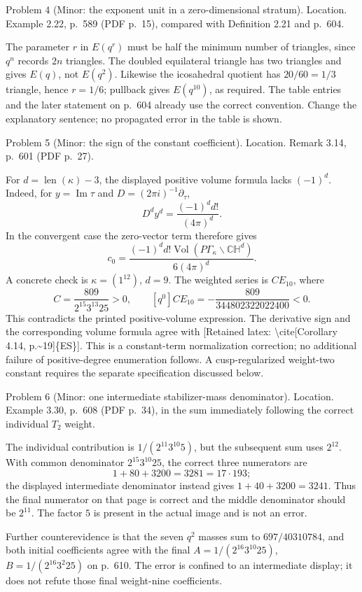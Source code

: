 \documentclass[10pt]{article}
\begin{document}
Problem 4 (Minor: the exponent unit in a zero-dimensional stratum).  Location. Example 2.22, p. 589 (PDF p. 15), compared with Definition 2.21 and p. 604.\par
The parameter \(r\) in \(E(q^r)\) must be half the minimum number of triangles, since \(q^n\) records \(2n\) triangles. The doubled equilateral triangle has two triangles and gives \(E(q)\), not \(E(q^2)\). Likewise the icosahedral quotient has \(20/60=1/3\) triangle, hence \(r=1/6\); pullback gives \(E(q^{10})\), as required. The table entries and the later statement on p. 604 already use the correct convention. Change the explanatory sentence; no propagated error in the table is shown.\par
Problem 5 (Minor: the sign of the constant coefficient).  Location. Remark 3.14, p. 601 (PDF p. 27).\par
For \(d=\operatorname{len}(\kappa)-3\), the displayed positive volume formula lacks \((-1)^d\). Indeed, for \(y=\operatorname{Im}\tau\) and \(D=(2\pi i)^{-1}\partial_\tau\), \[D^d y^d=\frac{(-1)^d d!}{(4\pi)^d}.\] In the convergent case the zero-vector term therefore gives \[c_0=\frac{(-1)^d d!\mathop{\mathrm{Vol}}(P\Gamma_\kappa\backslash\mathbb{CH}^d)}
               {6(4\pi)^d}.\] A concrete check is \(\kappa=(1^{12})\), \(d=9\). The weighted series is \(C E_{10}\), where \[C=\frac{809}{2^{15}3^{13}25}>0,\qquad
 [q^0]CE_{10}=-\frac{809}{344802322022400}<0.\] This contradicts the printed positive-volume expression. The derivative sign and the corresponding volume formula agree with [Retained latex: \textbackslash{}cite[Corollary 4.14, p.\textasciitilde{}19]\{ES\}]. This is a constant-term normalization correction; no additional failure of positive-degree enumeration follows. A cusp-regularized weight-two constant requires the separate specification discussed below.\par
Problem 6 (Minor: one intermediate stabilizer-mass denominator).  Location. Example 3.30, p. 608 (PDF p. 34), in the sum immediately following the correct individual \(T_2\) weight.\par
The individual contribution is \(1/(2^{11}3^{10}5)\), but the subsequent sum uses \(2^{12}\). With common denominator \(2^{15}3^{10}25\), the correct three numerators are \[1+80+3200=3281=17\cdot193;\] the displayed intermediate denominator instead gives \(1+40+3200=3241\). Thus the final numerator on that page is correct and the middle denominator should be \(2^{11}\). The factor \(5\) is present in the actual image and is not an error.\par
Further counterevidence is that the seven \(q^2\) masses sum to \(697/40310784\), and both initial coefficients agree with the final \(A=1/(2^{16}3^{10}25)\), \(B=1/(2^{16}3^2 25)\) on p. 610. The error is confined to an intermediate display; it does not refute those final weight-nine coefficients.\par
\end{document}
